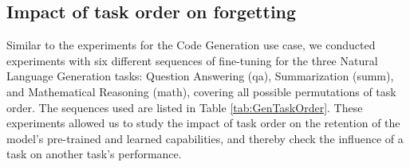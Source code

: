 \subsection{Impact of task order on forgetting} \label{TraceTaskOrderImpact}
Similar to the experiments for the Code Generation use case, we conducted experiments with six different sequences of fine-tuning for the three Natural Language Generation tasks: Question Answering (qa), Summarization (summ), and Mathematical Reasoning (math), covering all possible permutations of task order. The sequences used are listed in Table \ref{tab:GenTaskOrder}. These experiments allowed us to study the impact of task order on the retention of the model's pre-trained and learned capabilities, and thereby check the influence of a task on another task's performance. 

% 
